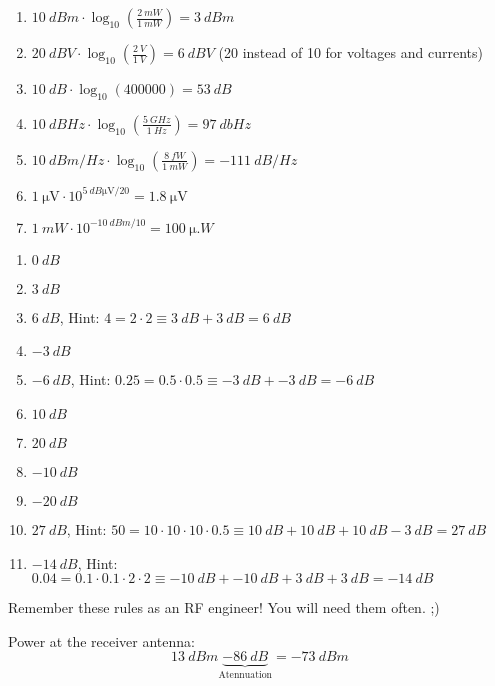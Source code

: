\begin{solution}
	\begin{tasks}
		\task
		\begin{enumerate}
			\item $\SI{10}{dBm} \cdot \log_{10} \left(\frac{\SI{2}{mW}}{\SI{1}{mW}}\right) = \SI{3}{dBm}$
			\item $\SI{20}{dBV} \cdot \log_{10} \left(\frac{\SI{2}{V}}{\SI{1}{V}}\right) = \SI{6}{dBV}$ (20 instead of 10 for voltages and currents)
			\item $\SI{10}{dB} \cdot \log_{10} \left(400000\right) = \SI{53}{dB}$
			\item $\SI{10}{dBHz} \cdot \log_{10} \left(\frac{\SI{5}{GHz}}{\SI{1}{Hz}}\right) = \SI{97}{dbHz}$
			\item $\SI{10}{dBm/Hz} \cdot \log_{10} \left(\frac{\SI{8}{fW}}{\SI{1}{mW}}\right) = \SI{-111}{dB/Hz}$
			\item $\SI{1}{\micro\volt} \cdot 10^{\SI{5}{dB\micro\volt} / 20} = \SI{1.8}{\micro\volt}$
			\item $\SI{1}{mW} \cdot 10^{\SI{-10}{dBm} / 10} = \SI{100}{\micro.W}$
		\end{enumerate}
	
		\task
		\begin{enumerate}
			\item $\SI{0}{dB}$
			\item $\SI{3}{dB}$
			\item $\SI{6}{dB}$, Hint: $4 = 2 \cdot 2 \equiv \SI{3}{dB} + \SI{3}{dB} = \SI{6}{dB}$
			\item $\SI{-3}{dB}$
			\item $\SI{-6}{dB}$, Hint: $0.25 = 0.5 \cdot 0.5 \equiv \SI{-3}{dB} + \SI{-3}{dB} = \SI{-6}{dB}$
			\item $\SI{10}{dB}$
			\item $\SI{20}{dB}$
			\item $\SI{-10}{dB}$
			\item $\SI{-20}{dB}$
			\item $\SI{27}{dB}$, Hint: $50 = 10 \cdot 10 \cdot 10 \cdot 0.5 \equiv \SI{10}{dB} + \SI{10}{dB} + \SI{10}{dB} - \SI{3}{dB} = \SI{27}{dB}$
			\item $\SI{-14}{dB}$, Hint: $0.04 = 0.1 \cdot 0.1 \cdot 2 \cdot 2 \equiv \SI{-10}{dB} + \SI{-10}{dB} + \SI{3}{dB} + \SI{3}{dB} = \SI{-14}{dB}$
		\end{enumerate}
		Remember these rules as an RF engineer! You will need them often. ;)
		
		\task
		Power at the receiver antenna:
		\begin{equation*}
			\SI{13}{dBm} \underbrace{- \SI{86}{dB}}_{\text{Atennuation}} = \SI{-73}{dBm}
		\end{equation*}
		

\end{tasks}
\end{solution}
